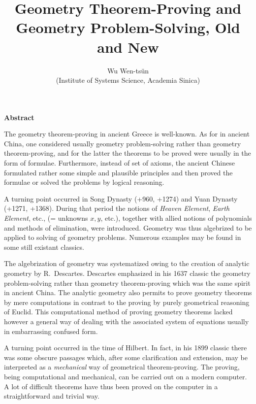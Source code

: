 \title{Geometry Theorem-Proving and Geometry Problem-Solving, Old and New}
\author{\sc Wu Wen-ts\"un \\ 
\sc (Institute of Systems Science, Academia Sinica)}
\date{} 

\maketitle

\vskip 1cm
\centerline{\bf Abstract}

\medskip
      The geometry theorem-proving in ancient Greece is well-known.  As
   for in ancient China, one considered usually geometry problem-solving
   rather than geometry theorem-proving, and for the latter the theorems
   to be proved were usually in the form of formulae.  Furthermore, 
   instead of set of axioms, the ancient Chinese formulated rather some
   simple and plausible principles and then proved the formulae or solved
   the problems by logical reasoning.

      A turning point occurred in Song Dynasty (+960, +1274) and Yuan
   Dynasty (+1271, +1368).  During that period the notions of {\em Heaven
   Element}, {\em Earth Element}, etc., (= unknowns $x,y$, etc.), together 
   with allied notions of polynomials and methods of elimination, were 
   introduced. Geometry was thus algebrized to be applied to solving of 
   geometry problems.  Numerous examples may be found in some still existant
   classics.

      The algebrization of geometry was systematized owing to the creation
   of analytic geometry by R.\ Descartes.  Descartes emphasized in his 1637
   classic the geometry problem-solving rather than geometry 
   theorem-proving which was the same spirit in ancient China. The analytic
   geometry also permits to prove geometry theorems by mere computations
   in contrast to the proving by purely geometrical reasoning of Euclid.
   This computational method of proving geometry theorems lacked however
   a general way of dealing with the associated system of equations usually
   in embarrassing confused form.

      A turning point occurred in the time of Hilbert.  In fact, in his 1899
   classic there was some obscure passages which, after some clarification
   and extension, may be interpreted as a {\em mechanical\/} way of geometrical
   theorem-proving.  The proving, being computational and mechanical, can
   be carried out on a modern computer.  A lot of difficult theorems have
   thus been proved on the computer in a straightforward and trivial way.

